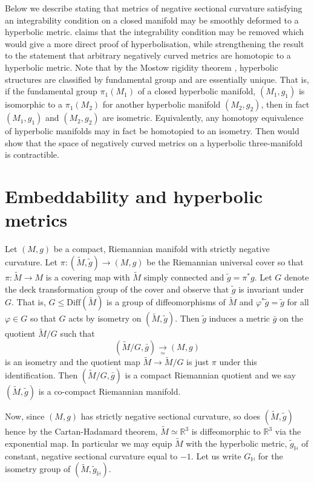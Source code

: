 \documentclass{cambridge7a}
\renewcommand{\~}{\tilde}
\renewcommand{\-}{\bar}
\newcommand{\R}{\mathbb{R}}
\renewcommand{\H}{\mathbb{H}}
\newcommand{\8}{\infty}
\begin{document}
Below we describe  stating that metrics of negative sectional curvature satisfying an integrability condition on a closed manifold may be smoothly deformed to a hyperbolic metric.  claims that the integrability condition may be removed which would give a more direct proof of hyperbolisation, while strengthening the result to the statement that arbitrary negatively curved metrics are homotopic to a hyperbolic metric. Note that by the Mostow rigidity theorem \cite{MR0236383}, hyperbolic structures are classified by fundamental group and are essentially unique. That is, if the fundamental group \(\pi_1(M_1)\) of a closed hyperbolic manifold, \((M_1, g_1)\) is isomorphic to a \(\pi_1(M_2)\) for another hyperbolic manifold \((M_2, g_2)\), then in fact \((M_1, g_1)\) and \((M_2, g_2)\) are isometric. Equivalently, any homotopy equivalence of hyperbolic manifolds may in fact be homotopied to an isometry. Then  would show that the space of negatively curved metrics on a hyperbolic three-manifold is contractible.

\section{Embeddability and hyperbolic metrics}
\label{sec:embed_intg}

Let \((M, g)\) be a compact, Riemannian manifold with strictly negative curvature. Let \(\pi\colon (\tilde{M}, \tilde{g}) \to (M, g)\) be the Riemannian universal cover so that \(\pi : \tilde{M} \to M\) is a covering map with \(\tilde{M}\) simply connected and \(\tilde{g} = \pi^{\ast} g\). Let \(G\) denote the deck transformation group of the cover and observe that \(\tilde{g}\) is invariant under \(G\). That is, \(G \leq \text{Diff}(\tilde{M})\) is a group of diffeomorphisms of \(\tilde{M}\) and \(\varphi^{\ast} \tilde{g} = \tilde{g}\) for all \(\varphi \in G\) so that \(G\) acts by isometry on \((\tilde{M}, \tilde{g})\). Then \(\tilde{g}\) induces a metric \(\bar{g}\) on the quotient \(\tilde{M}/G\) such that
\[
(\tilde{M}/G, \bar{g}) \underset{\simeq}{\to} (M, g)
\]
is an isometry and the quotient map \(\tilde{M} \to \tilde{M}/G\) is just \(\pi\) under this identification. Then \((\tilde{M}/G, \bar{g})\) is a compact Riemannian quotient and we say \((\tilde{M}, \tilde{g})\) is a co-compact Riemannian manifold.

Now, since \((M, g)\) has strictly negative sectional curvature, so does \((\tilde{M}, \tilde{g})\) hence by the Cartan-Hadamard theorem, \(\tilde{M} \simeq \R^3\) is diffeomorphic to \(\R^3\) via the exponential map. In particular we may equip \(\tilde{M}\) with the hyperbolic metric, \(\tilde{g}_{\H}\) of constant, negative sectional curvature equal to \(-1\). Let us write \(G_{\H}\) for the isometry group of \((\tilde{M}, \tilde{g}_{\H})\).
\end{document}
